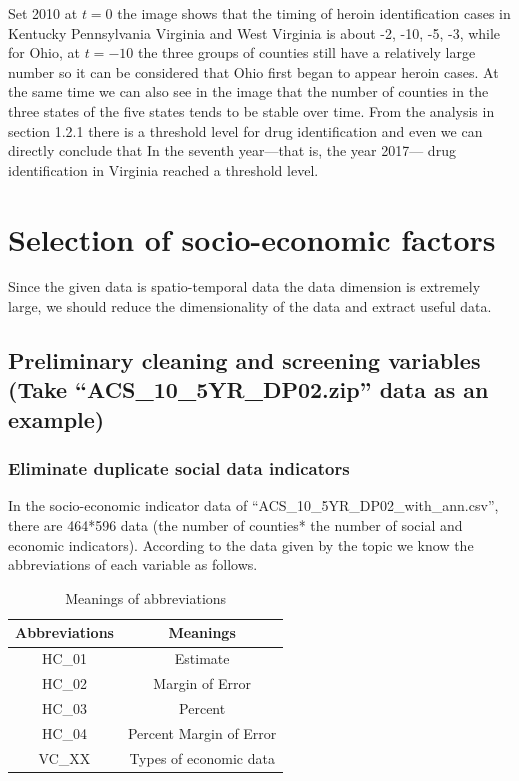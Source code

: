 \documentclass{mcmthesis}
\begin{document}
Set 2010 at $t = 0$ the image shows that the timing of heroin identification cases in Kentucky Pennsylvania Virginia and West Virginia is about -2, -10, -5, -3, while for Ohio, at $t = -10$ the three groups of counties still have a relatively large number so it can be considered that Ohio first began to appear heroin cases.  At the same time we can also see in the image that the number of counties in the three states of the five states tends to be stable over time. From the analysis in section 1.2.1 there is a threshold level for drug identification and even we can directly conclude that In the seventh year---that is, the year 2017--- drug identification in Virginia reached a threshold level.













\section{Selection of socio-economic factors}
Since the given data is spatio-temporal data the data dimension is extremely large, we should reduce the dimensionality of the data and extract useful data. 

\subsection{Preliminary cleaning and screening variables \\\small{(Take “ACS\_10\_5YR\_DP02.zip” data as an example)}}

\subsubsection{Eliminate duplicate social data indicators}
In the socio-economic indicator data of “ACS\_10\_5YR\_DP02\_with\_ann.csv”, there are 464*596 data (the number of counties* the number of social and economic indicators). According to the data given by the topic we know the abbreviations of each variable as follows.

\begin{table}[htbp]
  \centering
  \caption{Meanings of abbreviations}
    \begin{tabular}{cc}
    \toprule
    Abbreviations & Meanings \\
    \midrule
    HC\_01 & Estimate\\
    HC\_02 & Margin of Error \\
    HC\_03 & Percent \\
    HC\_04 & Percent Margin of Error \\
    VC\_XX & Types of economic data \\
    \bottomrule
    \end{tabular}%
  \label{tab:abbreviations}%
\end{table}%
\end{document}
